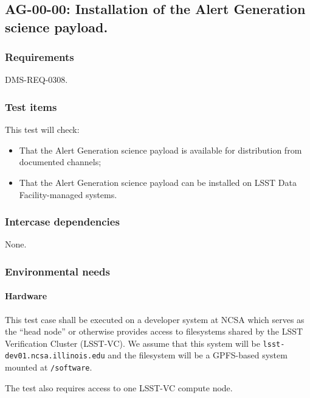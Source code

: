 \subsection{AG-00-00: Installation of the Alert Generation science payload.}
\label{ag-00-00}

\subsubsection{Requirements}

DMS-REQ-0308.

\subsubsection{Test items}

This test will check:

\begin{itemize}

  \item{That the Alert Generation science payload is available for
  distribution from documented channels;}

  \item{That the Alert Generation science payload can be installed on
  LSST Data Facility-managed systems.}

\end{itemize}

\subsubsection{Intercase dependencies}

None.

\subsubsection{Environmental needs}

\paragraph{Hardware}

This test case shall be executed on a developer system at NCSA which serves as
the ``head node'' or otherwise provides access to filesystems shared by the
LSST Verification Cluster (LSST-VC). We assume that this system will be
\texttt{lsst-dev01.ncsa.illinois.edu} and the filesystem will be a GPFS-based
system mounted at \texttt{/software}.

The test also requires access to one LSST-VC compute node.

